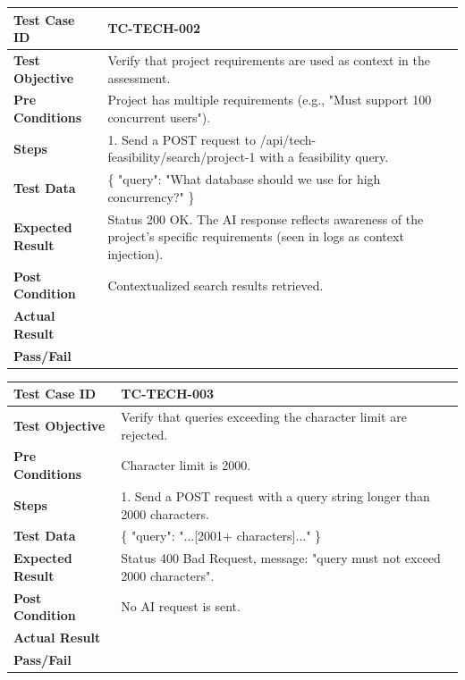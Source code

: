 \begin{longtable}{|p{}|p{}|}
\hline
\textbf{Test Case ID} & TC-TECH-002 \\ \hline
\textbf{Test Objective} & Verify that project requirements are used as context in the assessment. \\ \hline
\textbf{Pre Conditions} & Project has multiple requirements (e.g., "Must support 100 concurrent users"). \\ \hline
\textbf{Steps} & 
1. Send a POST request to /api/tech-feasibility/search/project-1 with a feasibility query. \\ \hline
\textbf{Test Data} & \{ "query": "What database should we use for high concurrency?" \} \\ \hline
\textbf{Expected Result} & Status 200 OK. The AI response reflects awareness of the project's specific requirements (seen in logs as context injection). \\ \hline
\textbf{Post Condition} & Contextualized search results retrieved. \\ \hline
\textbf{Actual Result} &  \\ \hline
\textbf{Pass/Fail} &  \\ \hline
\end{longtable}

\begin{longtable}{|p{}|p{}|}
\hline
\textbf{Test Case ID} & TC-TECH-003 \\ \hline
\textbf{Test Objective} & Verify that queries exceeding the character limit are rejected. \\ \hline
\textbf{Pre Conditions} & Character limit is 2000. \\ \hline
\textbf{Steps} & 
1. Send a POST request with a query string longer than 2000 characters. \\ \hline
\textbf{Test Data} & \{ "query": "...[2001+ characters]..." \} \\ \hline
\textbf{Expected Result} & Status 400 Bad Request, message: "query must not exceed 2000 characters". \\ \hline
\textbf{Post Condition} & No AI request is sent. \\ \hline
\textbf{Actual Result} &  \\ \hline
\textbf{Pass/Fail} &  \\ \hline
\end{longtable}

